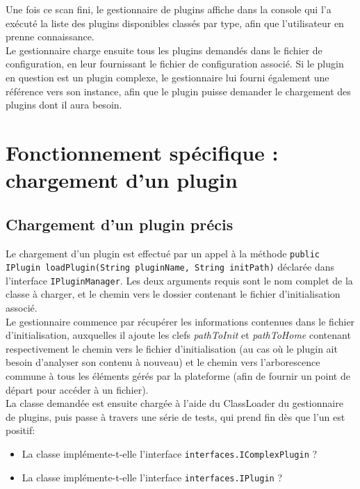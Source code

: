 Une fois ce scan fini, le gestionnaire de plugins affiche dans la console qui l'a exécuté la liste des plugins disponibles classés par type, afin que l'utilisateur en prenne connaissance.\\

Le gestionnaire charge ensuite tous les plugins demandés dans le fichier de configuration, en leur fournissant le fichier de configuration associé. Si le plugin en question est un plugin complexe, le gestionnaire lui fourni également une référence vers son instance, afin que le plugin puisse demander le chargement des plugins dont il aura besoin.

\section{Fonctionnement spécifique : chargement d'un plugin}

\subsection{Chargement d'un plugin précis}

Le chargement d'un plugin est effectué par un appel à la méthode \texttt{public IPlugin loadPlugin(String pluginName, String initPath)} déclarée dans l'interface \texttt{IPluginManager}. Les deux arguments requis sont le nom complet de la classe à charger, et le chemin vers le dossier contenant le fichier d'initialisation associé.\\

Le gestionnaire commence par récupérer les informations contenues dans le fichier d'initialisation, auxquelles il ajoute les clefs \textit{pathToInit} et \textit{pathToHome} contenant respectivement le chemin vers le fichier d'initialisation (au cas où le plugin ait besoin d'analyser son contenu à nouveau) et le chemin vers l'arborescence commune à tous les éléments gérés par la plateforme (afin de fournir un point de départ pour accéder à un fichier).\\

La classe demandée est ensuite chargée à l'aide du ClassLoader du gestionnaire de plugins, puis passe à travers une série de tests, qui prend fin dès que l'un est positif:\\

\begin{itemize}
	\item La classe implémente-t-elle l'interface \texttt{interfaces.IComplexPlugin} ?
	\item La classe implémente-t-elle l'interface \texttt{interfaces.IPlugin} ?\\
\end{itemize}

